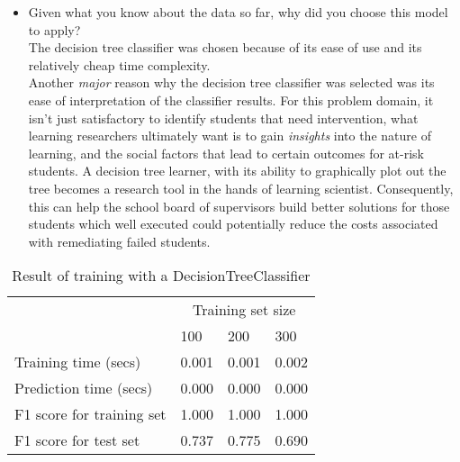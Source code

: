 \documentclass[12pt]{article}
\begin{document}
\begin{itemize} [noitemsep,nolistsep]
\begin{itemize}
\begin{itemize}[noitemsep,nolistsep]
                     \item Decision trees can be unstable because small variations in the data might result in a completely different tree being generated. 
                     \item The problem of learning an optimal decision tree is known to be NP-complete under several aspects of optimality and even for simple concepts. 
                     \item There are concepts that are hard to learn because decision trees do not express them easily, such as XOR, parity or multiplexer problems.
                     \item Decision tree learners create biased trees if some classes dominate. 
              \end{itemize}
       \end{itemize}


\item Given what you know about the data so far, why did you choose this model to apply?\\
The decision tree classifier was chosen because of its ease of use and its relatively cheap time complexity.\\
Another \textit{major} reason why the decision tree classifier was selected was its ease of interpretation of the classifier results. For this problem domain, it isn't just satisfactory to identify students that need intervention, what learning researchers ultimately want is to gain \textit{insights} into the nature of learning, and the social factors that lead to certain outcomes for at-risk students. A decision tree learner, with its ability to graphically plot out the tree becomes a research tool in the hands of learning scientist. Consequently, this can help the school board of supervisors build better solutions for those students which well executed could potentially reduce the costs associated with remediating failed students.
\end{itemize} 


\setlength{\extrarowheight}{1.5pt}
\begin{table}[!htbp]
\caption{Result of training with a DecisionTreeClassifier} %
\centering %
\begin{tabular}{|p{6cm}|p{1.5cm}|p{1.5cm}|p{1.5cm}|} %
\hline %
& \multicolumn{3}{c|}{Training set size}\\[5pt]
\cline{2-4} 
& 100 & 200 & 300\\[0.5ex]
\hline %

Training time (secs)   &       0.001 & 0.001 & 0.002 \\
Prediction time (secs)   &     0.000 & 0.000 & 0.000 \\
F1 score for training set  &   1.000 & 1.000 & 1.000 \\
F1 score for test set    &     0.737 & 0.775 & 0.690 \\
\hline %
\end{tabular}
\label{decisionTreeTable}
\end{table}
\end{document}
